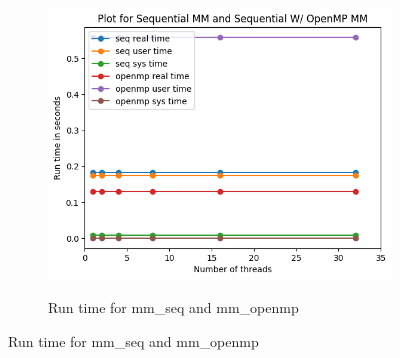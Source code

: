 \documentclass{article}
\begin{document}
\begin{figure}[h]
  \begin{subfigure}[t]{.5\textwidth}
\centering  \includegraphics[width=\textwidth]{others}
\label{fig: mm_seq and mm_openmp}
\caption{Run time for mm\_seq and mm\_openmp}


\end{subfigure}
\end{figure}
\end{document}
